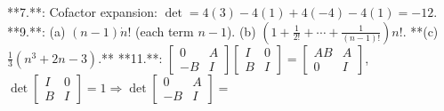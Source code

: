 

**7.**: Cofactor expansion: \(\det=4(3)-4(1)+4(-4)-4(1)=-12\).
**9.**: (a) \((n-1)\dot{n}!\) (each term \(n-1\)). (b) \(\left(1+\frac{1}{2!}+\cdots+\frac{1}{(n-1)!}\right)n!\).
**(c) \(\frac{1}{3}(n^{3}+2n-3)\).**
**11.**: \(\left[\begin{matrix}0&A\\ -B&I\end{matrix}\right]\left[\begin{matrix}I&0\\ B&I\end{matrix}\right]=\left[\begin{matrix}AB&A\\ 0&I\end{matrix}\right]\), \(\det\left[\begin{matrix}I&0\\ B&I\end{matrix}\right]=1\Rightarrow\det\left[\begin{matrix}0&A\\ -B&I\end{matrix}\right]=\)

